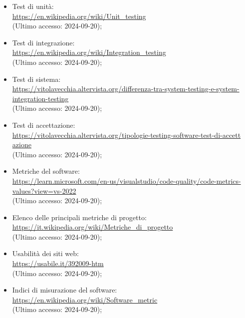 \begin{itemize}
  \item Test di unità: \\ \href{https://en.wikipedia.org/wiki/Unit_testing}{https://en.wikipedia.org/wiki/Unit\_testing}  \\ (Ultimo accesso: 2024-09-20);
  \item Test di integrazione: \\ \href{https://en.wikipedia.org/wiki/Integration_testing}{https://en.wikipedia.org/wiki/Integration\_testing}  \\ (Ultimo accesso: 2024-09-20);
  \item Test di sistema: \\ \href{https://vitolavecchia.altervista.org/differenza-tra-system-testing-e-system-integration-testing}{https://vitolavecchia.altervista.org/differenza-tra-system-testing-e-system-\\integration-testing}  \\ (Ultimo accesso: 2024-09-20);
  \item Test di accettazione: \\ \href{https://vitolavecchia.altervista.org/tipologie-testing-software-test-di-accettazione}{https://vitolavecchia.altervista.org/tipologie-testing-software-test-di-accett \- azione}  \\ (Ultimo accesso: 2024-09-20);
  \item Metriche del software: \\ \href{https://learn.microsoft.com/en-us/visualstudio/code-quality/code-metrics-values?view=vs-2022}{https://learn.microsoft.com/en-us/visualstudio/code-quality/code-metrics-\\values?view=vs-2022}  \\ (Ultimo accesso: 2024-09-20);
  \item Elenco delle principali metriche di progetto: \\ \href{https://it.wikipedia.org/wiki/Metriche_di_progetto}{https://it.wikipedia.org/wiki/Metriche\_di\_progetto}  \\ (Ultimo accesso: 2024-09-20); 
  \item Usabilità dei siti web: \\ \href{https://usabile.it/392009-htm}{https://usabile.it/392009-htm}  \\ (Ultimo accesso: 2024-09-20);
  \item Indici di misurazione del software: \\ \href{https://en.wikipedia.org/wiki/Software_metric}{https://en.wikipedia.org/wiki/Software\_metric}  \\ (Ultimo accesso: 2024-09-20);

\end{itemize}
